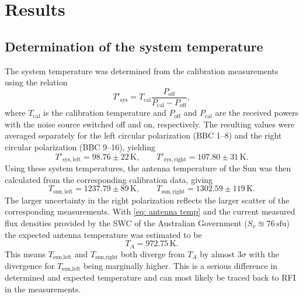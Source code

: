 \documentclass[10pt,a4paper, bibliography=totoc]{scrartcl}
\begin{document}
\section{Results}

\subsection{Determination of the system temperature}
\label{sec: res sys temp}
The system temperature was determined from the calibration measurements using the relation
\[
T'_{\mathrm{sys}} = T_{\mathrm{cal}} \frac{P_{\mathrm{off}}}{P_{\mathrm{cal}}-P_{\mathrm{off}}},
\]
where $T_{\mathrm{cal}}$ is the calibration temperature and $P_{\mathrm{off}}$ and $P_{\mathrm{cal}}$ are the received powers with the noise source switched off and on, respectively. The resulting values were averaged separately for the left circular polarization (BBC 1--8) and the right circular polarization (BBC 9--16), yielding
\[
T'_{\mathrm{sys,left}} = 98.76 \pm 22\,\mathrm{K},
\qquad
T'_{\mathrm{sys,right}} = 107.80 \pm 31\,\mathrm{K}.
\]
Using these system temperatures, the antenna temperature of the Sun was then calculated from the corresponding calibration data, giving
\[
T_{\mathrm{sun,left}} = 1237.79 \pm 89\,\mathrm{K},
\qquad
T_{\mathrm{sun,right}} = 1302.59 \pm 119\,\mathrm{K}.
\]
The larger uncertainty in the right polarization reflects the larger scatter of the corresponding measurements. 
With \autoref{eq: antenna temp} and the current measured flux densities provided by the SWC of the Australian Government ($S_{\nu} \approxeq 76 \, \text{sfu}$) the expected antenna temperature was estimated to be
\[
T_A = 972.75\,\mathrm{K}.
\]
This means $T_\text{sun,left}$ and $T_\text{sun,right}$ both diverge from $T_A$ by almost $3\sigma$ with the divergence for $T_\text{sun,left}$ being marginally higher. This is a serious difference in determined and expected temperature and can most likely be traced back to RFI in the measurements.
\end{document}
